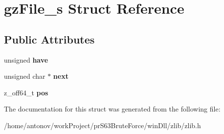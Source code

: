 \hypertarget{structgz_file__s}{}\section{gz\+File\+\_\+s Struct Reference}
\label{structgz_file__s}
\subsection*{Public Attributes}
\begin{DoxyCompactItemize}
\item 
\mbox{\label{structgz_file__s_abb96e208e17a991c09b4df6cefcc1c04}} 
unsigned {\bfseries have}
\item 
\mbox{\label{structgz_file__s_a8c1f4682372cc228f4e37bf7f95870a8}} 
unsigned char $\ast$ {\bfseries next}
\item 
\mbox{\label{structgz_file__s_a98038b7edb4ab55ee321fa388afb687e}} 
z\+\_\+off64\+\_\+t {\bfseries pos}
\end{DoxyCompactItemize}


The documentation for this struct was generated from the following file\+:\begin{DoxyCompactItemize}
\item 
/home/antonov/work\+Project/pr\+S63\+Brute\+Force/win\+Dll/zlib/zlib.\+h\end{DoxyCompactItemize}

